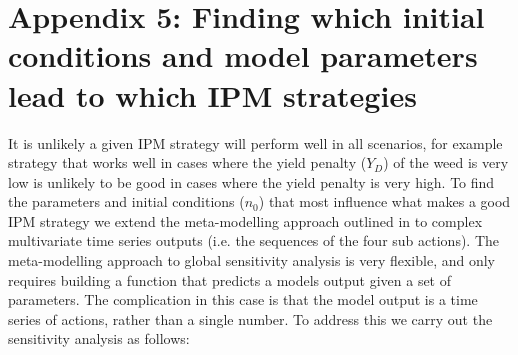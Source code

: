 \documentclass[12pt, a4paper]{article}
\begin{document}
\section*{Appendix 5: Finding which initial conditions and model parameters lead to which IPM strategies}
It is unlikely a given IPM strategy will perform well in all scenarios, for example strategy that works well in cases where the yield penalty ($Y_D$) of the weed is very low is unlikely to be good in cases where the yield penalty is very high. To find the parameters and initial conditions ($n_0$) that most influence what makes a good IPM strategy we extend the meta-modelling approach outlined in \citep{Cout2014} to complex multivariate time series outputs (i.e. the sequences of the four sub actions). The meta-modelling approach to global sensitivity analysis is very flexible, and only requires building a function that predicts a models output given a set of parameters. The complication in this case is that the model output is a time series of actions, rather than a single number. To address this we carry out the sensitivity analysis as follows:
\end{document}
